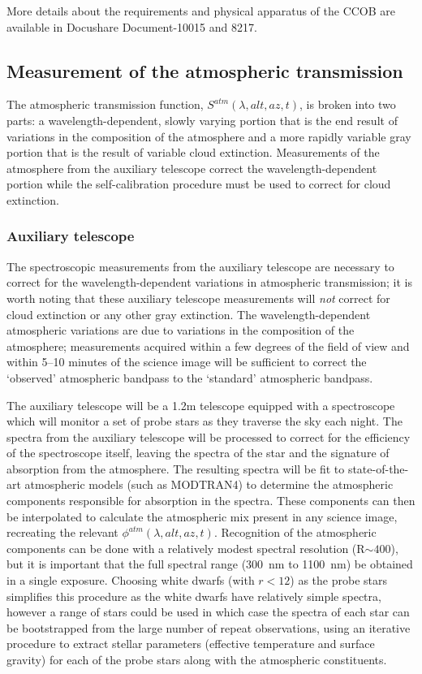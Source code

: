 \documentclass[12pt,preprint]{aastex}
\begin{document}
More details about the requirements and physical apparatus of the CCOB
are available in Docushare Document-10015 and 8217.

\subsection{Measurement of the atmospheric transmission} 

The atmospheric transmission function, $S^{atm}(\lambda,alt,az,t)$, is
broken into two parts: a wavelength-dependent, slowly varying portion
that is the end result of variations in the composition of the
atmosphere and a more rapidly variable gray portion that is the result
of variable cloud extinction. Measurements of the atmosphere from the
auxiliary telescope correct the wavelength-dependent portion while the
self-calibration procedure must be used to correct for cloud
extinction. 

\subsubsection{Auxiliary telescope}
\label{sec:auxtele}

The spectroscopic measurements from the auxiliary telescope are
necessary to correct for the wavelength-dependent variations in
atmospheric transmission; it is worth noting that these auxiliary
telescope measurements will {\it not} correct for cloud extinction or
any other gray extinction. The wavelength-dependent atmospheric
variations are due to variations in the composition of the atmosphere;
measurements acquired within a few degrees of the field of view and
within 5--10 minutes of the science image will be sufficient to
correct the `observed' atmospheric bandpass to the `standard'
atmospheric bandpass.

The auxiliary telescope will be a 1.2m telescope equipped with a
spectroscope which will monitor a set of probe stars as they traverse
the sky each night. The spectra from the auxiliary telescope will be
processed to correct for the efficiency of the spectroscope itself,
leaving the spectra of the star and the signature of absorption from
the atmosphere. The resulting spectra will be fit to state-of-the-art
atmospheric models (such as MODTRAN4) to determine the atmospheric
components responsible for absorption in the spectra. These components
can then be interpolated to calculate the atmospheric mix present in
any science image, recreating the relevant
$\phi^{atm}(\lambda,alt,az,t)$. Recognition of the atmospheric components
can be done with a relatively modest spectral resolution (R$\sim400$),
but it is important that the full spectral range (300~nm to 1100~nm)
be obtained in a single exposure. Choosing white dwarfs (with $r<12$)
as the probe stars simplifies this procedure as the white dwarfs have
relatively simple spectra, however a range of stars could be used in
which case the spectra of each star can be bootstrapped from the large
number of repeat observations, using an iterative procedure to extract
stellar parameters (effective temperature and surface gravity) for
each of the probe stars along with the atmospheric constituents. 
\end{document}
